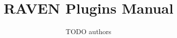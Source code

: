 \documentclass[pdf,12pt]{INLreport}
\title{RAVEN Plugins Manual}
\author{ TODO authors
}
\date{}
\begin{document}
    \sloppy
    \maketitle

%    







    \cleardoublepage		%
    \tableofcontents




\end{document}
